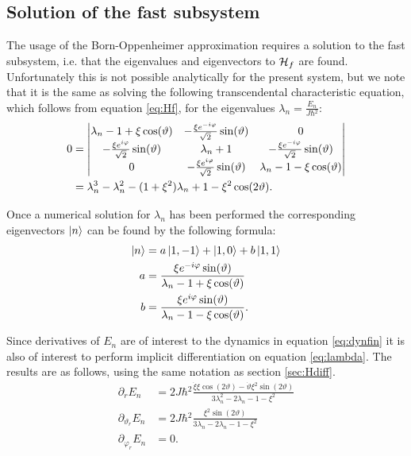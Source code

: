 \documentclass[a4paper]{article}
\begin{document}
\subsection{Solution of the fast subsystem}
The usage of the Born-Oppenheimer approximation requires a solution to the fast subsystem,
i.e. that the eigenvalues and eigenvectors to \(\mathbb{\cal H}_f\) are found.
Unfortunately this is not possible analytically for the present system, but we note that it
is the same as solving the following transcendental characteristic equation, which follows
from equation \ref{eq:Hf}, for the
eigenvalues \(\lambda_n = \frac{E_n}{J\hbar{}^2}\): %
\begin{align}
        0 &= \mdet{
                \lambda_n - 1 + \xi \cos(\vartheta) & -\frac{\xi e^{-i\varphi}}{\sqrt{2}
                }\sin(\vartheta) & 0 \\
                -\frac{\xi e^{i\varphi}}{\sqrt{2}
                }\sin(\vartheta) & \lambda_n + 1 & -\frac{\xi e^{-i\varphi}}{\sqrt{2}
                }\sin(\vartheta)\\
                0 & -\frac{\xi e^{i\varphi}}{\sqrt{2}
                }\sin(\vartheta) & \lambda_n - 1 - \xi\cos(\vartheta)}\\
                &=
                 \lambda_n^3 - \lambda_n^2 -(1+ \xi^2)\lambda_n + 1 -
                 \xi^2\cos(2\vartheta)\label{eq:lambda}
.\end{align}

Once a numerical solution for \(\lambda_n\) has been performed the corresponding eigenvectors \(\ket{n}\) can be
found by the following formula:
\begin{align*}
      \ket{n} &= a\ket{1, -1} + \ket{1, 0} + b\ket{1, 1} \\
      a &= \frac{\xi e^{-i\varphi}\sin(\vartheta)}{\lambda_n -1 + \xi\cos(\vartheta)} \\
      b &= \frac{\xi e^{i \varphi}\sin(\vartheta)}{\lambda_n - 1 -\xi\cos(\vartheta)}
.\end{align*}

Since derivatives of \(E_n\) are of interest to the dynamics in equation \ref{eq:dynfin}
it is also of interest to perform implicit differentiation on equation \ref{eq:lambda}. The
results are as follows, using the same notation as section \ref{sec:Hdiff}.
\begin{align*}
        \partial_r E_n &= 2J\hbar{}^2 \frac{\dot \xi \xi \cos(2\vartheta) - \dot \vartheta \xi^2
    \sin(2\vartheta)}{3\lambda_n^2 - 2\lambda_n - 1 - \xi^2}\\
    \partial_{\vartheta_r} E_n &= 2J\hbar{}^2 \frac{\xi^2\sin(2\vartheta)}{3\lambda_n -
    2\lambda_n -1 -\xi^2} \\
            \partial_{\varphi_r} E_n &= 0 %
.\end{align*}
\end{document}
